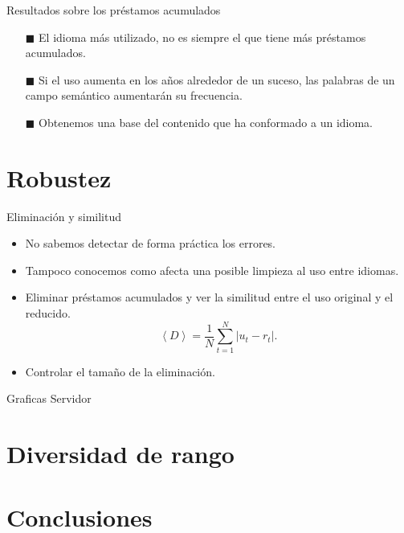 \documentclass[10pt,xcolor={usenames,dvipsnames}]{beamer}
\begin{document}
\begin{frame}{Resultados sobre los préstamos acumulados}
	\begin{itemize}
		\item [$\blacksquare$]  El idioma más utilizado, no es siempre el que tiene más préstamos acumulados.
		\item [$\blacksquare$] Si el uso aumenta en los años alrededor de un suceso, las palabras de un campo semántico aumentarán su frecuencia.
		\item [$\blacksquare$] Obtenemos una base del contenido que ha conformado a un idioma.
	\end{itemize}
\end{frame}

\section{Robustez} 

\begin{frame}[fragile]{Eliminación y similitud}
	\only<1->{
	Problemas :}
	\begin{itemize}
		\item <2->No sabemos detectar de forma práctica los errores.
		\item <3->Tampoco conocemos como afecta una posible limpieza al uso entre idiomas.
	\end{itemize}
	
	\begin{itemize}
		\item <4->Eliminar préstamos acumulados y ver la similitud entre el uso original y el reducido.
		$$
		\left\langle D \right\rangle  = \frac{1}{N}\sum_{t=1}^{N} \left| u_{t} - r_{t} \right|.
		$$
		\item <5>Controlar el tamaño de la eliminación. 
	\end{itemize}
\end{frame}

\begin{frame}{Graficas Servidor}

\end{frame}


\section{Diversidad de rango}

\section{Conclusiones}
\end{document}
